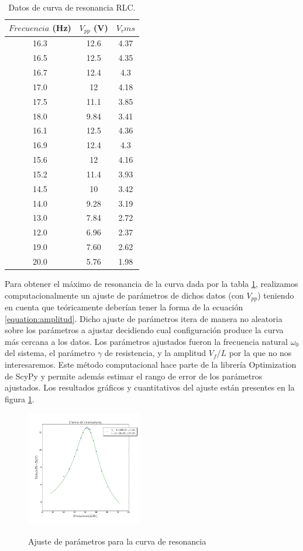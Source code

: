 \documentclass[%
 reprint,
 amsmath,amssymb,
 aps,
]{revtex4-1}
\begin{document}
{\begin{table}[h!]
\centering
 \begin{tabular}{|c|c|c|} 
 \hline
 $Frecuencia$ (Hz) & $V_{pp}$ (V) & $V_rms$ \\ [0.5ex] 
 \hline\hline
16.3 &		12.6 &		4.37\\
16.5 &		12.5 &		4.35\\
16.7 &		12.4 &		4.3\\
17.0 &		12 &		4.18\\
17.5 &		11.1 &		3.85\\
18.0 &		9.84 &		3.41\\
16.1 &		12.5 &		4.36\\
16.9 &		12.4 &		4.3\\
15.6 &		12 &		4.16\\
15.2 &		11.4 &		3.93\\
14.5 &		10 &		3.42\\
14.0 &		9.28 &		3.19\\
13.0 &		7.84 &		2.72\\
12.0 &		6.96 &		2.37\\
19.0 &		7.60 &		2.62\\
20.0 &		5.76 &		1.98\\
[1ex] 
 \hline
 \end{tabular}
 \caption{Datos de curva de resonancia RLC.}
 \label{table:resonancia}
\end{table}

Para obtener el máximo de resonancia de la curva dada por la tabla \ref{table:resonancia}, realizamos computacionalmente un ajuste de parámetros de dichos datos (con $V_{pp}$) teniendo en cuenta que te\'oricamente deber\'ian tener la forma de la ecuaci\'on \ref{equation:amplitud}. Dicho ajuste de parámetros itera de manera no aleatoria sobre los par\'ametros a ajustar decidiendo cual configuraci\'on produce la curva m\'as cercana a los datos. Los par\'ametros ajustados fueron la frecuencia natural $\omega_0$ del sistema, el par\'ametro $\gamma$ de resistencia, y la amplitud $V_f/L$ por la que no nos interesaremos. Este m\'etodo computacional hace parte de la librer\'ia Optimization de ScyPy y permite adem\'as estimar el rango de error de los par\'ametros ajustados. Los resultados gr\'aficos y cuantitativos del ajuste est\'an presentes en la figura \ref{fig:resonancia}.\\

\begin{figure}[h]
\caption{Ajuste de parámetros para la curva de resonancia}
\centering
\includegraphics[width=0.45\textwidth]{resonancia}
\label{fig:resonancia}
\end{figure}

}
\end{document}
